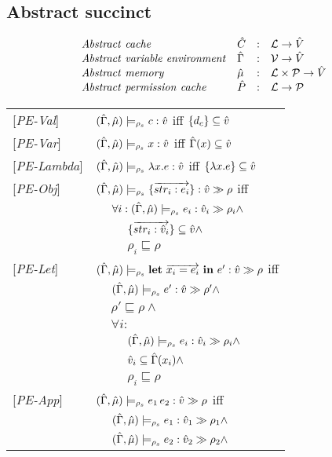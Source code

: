 \subsection{Abstract succinct}
\[
\begin{array}{llcl}
\mathit{Abstract\ cache} & \hat{C} & : & {\mathcal L} \rightarrow \hat{V} \\
\mathit{Abstract\ variable\ environment} & \hat{\Gamma} & : & \mathcal{V} \rightarrow \hat{V} \\
\mathit{Abstract\ memory} & \hat{\mu} & : & {\mathcal L} \times \mathcal{P} \rightarrow \hat{V} \\
\mathit{Abstract\ permission\ cache} & \hat{P} & : & {\mathcal L} \rightarrow \mathcal{P} \\
\end{array}
\]
\begin{tabular}{l l l l}
{[\textit{PE-Val}]}&\multicolumn{3}{l}{$(\hat{\Gamma},\hat{\mu}) \models_{\rho_s} c : \hat{v}$ iff $\{d_c\} \subseteq \hat{v}$} \\
{[\textit{PE-Var}]}&\multicolumn{3}{l}{$(\hat{\Gamma},\hat{\mu}) \models_{\rho_s} x : \hat{v}$ iff $\hat{\Gamma}(x) \subseteq \hat{v}$} \\ 
{[\textit{PE-Lambda}]}&\multicolumn{3}{l}{$(\hat{\Gamma},\hat{\mu}) \models_{\rho_s} \lambda x.e : \hat{v}$ iff $\{\lambda x.e\} \subseteq \hat{v}$} \\
{[\textit{PE-Obj}]}&\multicolumn{3}{l}{$(\hat{\Gamma},\hat{\mu}) \models_{\rho_s} \{\overrightarrow{str_i : e_i}\} : \hat{v} \gg \rho$ iff} \\
&&\multicolumn{2}{l}{$\forall i: (\hat{\Gamma},\hat{\mu}) \models_{\rho_s} e_i : \hat{v}_{i} \gg \rho_{i} \wedge$}\\
&&&$\{\overrightarrow{str_i :\hat{v}_i}\} \subseteq \hat{v} \wedge$ \\
&&&$\rho_i \sqsubseteq \rho$ \\ 
{[\textit{PE-Let}]}&\multicolumn{3}{l}{$(\hat{\Gamma},\hat{\mu}) \models_{\rho_s} \mathbf{let}\ \overrightarrow{x_i = e_i}\ \mathbf{in}\ e' : \hat{v} \gg \rho$ iff}\\
&&\multicolumn{2}{l}{$(\hat{\Gamma},\hat{\mu}) \models_{\rho_s} e' : \hat{v} \gg \rho' \wedge$} \\
&&\multicolumn{2}{l}{$\rho' \sqsubseteq \rho \wedge$} \\
&&\multicolumn{2}{l}{$ \forall i:$}\\
&&& $(\hat{\Gamma},\hat{\mu}) \models_{\rho_s} e_i : \hat{v}_{i} \gg \rho_{i} \wedge$ \\
&&& $\hat{v}_i \subseteq \hat{\Gamma}(x_i) \wedge$ \\
&&& $\rho_i \sqsubseteq \rho$ \\
{[\textit{PE-App}]}&\multicolumn{3}{l}{$(\hat{\Gamma},\hat{\mu}) \models_{\rho_s} e_1\, e_2 : \hat{v} \gg \rho$ iff} \\
&&\multicolumn{2}{l}{$(\hat{\Gamma},\hat{\mu}) \models_{\rho_s} e_1 : \hat{v}_{1} \gg \rho_{1} \wedge$} \\
&&\multicolumn{2}{l}{$(\hat{\Gamma},\hat{\mu}) \models_{\rho_s} e_2 : \hat{v}_{2} \gg \rho_{2} \wedge$} \\

\end{tabular}
